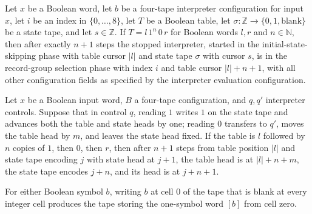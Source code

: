 \begin{lemma}
\label{Turing.timedCut_initial_skip}
\leanok
{}
Let $x$ be a Boolean word, let $b$ be a four-tape interpreter configuration for input
$x$, let $i$ be an index in $\{0,\ldots,8\}$, let $T$ be a Boolean table, let
$\sigma\colon\mathbb{Z}\to\{0,1,\mathrm{blank}\}$ be a state tape, and let
$s\in\mathbb{Z}$. If $T=l\,1^n\,0\,r$ for Boolean words $l,r$ and
$n\in\mathbb{N}$, then after exactly $n+1$ steps the stopped interpreter, started in
the initial-state-skipping phase with table cursor $|l|$ and state tape $\sigma$ with
cursor $s$, is in the record-group selection phase with index $i$ and table cursor
$|l|+n+1$, with all other configuration fields as specified by the interpreter
evaluation configuration.
\end{lemma}

\begin{lemma}
\label{Turing.timedCut_unary_copy}
\leanok
{}
Let $x$ be a Boolean input word, $B$ a four-tape configuration, and $q,q'$ interpreter
controls. Suppose that in control $q$, reading $1$ writes $1$ on the state tape and
advances both the table and state heads by one; reading $0$ transfers to $q'$, moves the
table head by $m$, and leaves the state head fixed. If the table is $l$ followed by $n$
copies of $1$, then $0$, then $r$, then after $n+1$ steps from table position $|l|$ and
state tape encoding $j$ with state head at $j+1$, the table head is at $|l|+n+m$, the
state tape encodes $j+n$, and its head is at $j+n+1$.
\end{lemma}

\begin{lemma}
\label{Turing.timedCut_install_marker}
\leanok
{}
For either Boolean symbol $b$, writing $b$ at cell $0$ of the tape that is blank at
every integer cell produces the tape storing the one-symbol word $[b]$ from cell zero.
\end{lemma}

